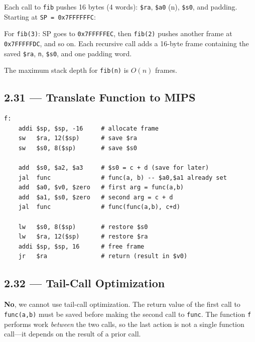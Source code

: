 Each call to \texttt{fib} pushes 16 bytes (4 words): \texttt{\$ra},
\texttt{\$a0} (n), \texttt{\$s0}, and padding. Starting at
\texttt{SP = 0x7FFFFFFC}:

For \texttt{fib(3)}: SP goes to \texttt{0x7FFFFFEC}, then \texttt{fib(2)}
pushes another frame at \texttt{0x7FFFFFDC}, and so on. Each recursive call
adds a 16-byte frame containing the saved \texttt{\$ra}, \texttt{n},
\texttt{\$s0}, and one padding word.

The maximum stack depth for \texttt{fib(n)} is $O(n)$ frames.

\subsection*{2.31 --- Translate Function to MIPS}
\hypertarget{sol-2.31}{}

\begin{verbatim}
f:
    addi $sp, $sp, -16     # allocate frame
    sw   $ra, 12($sp)      # save $ra
    sw   $s0, 8($sp)       # save $s0

    add  $s0, $a2, $a3     # $s0 = c + d (save for later)
    jal  func              # func(a, b) -- $a0,$a1 already set
    add  $a0, $v0, $zero   # first arg = func(a,b)
    add  $a1, $s0, $zero   # second arg = c + d
    jal  func              # func(func(a,b), c+d)

    lw   $s0, 8($sp)       # restore $s0
    lw   $ra, 12($sp)      # restore $ra
    addi $sp, $sp, 16      # free frame
    jr   $ra               # return (result in $v0)
\end{verbatim}

\subsection*{2.32 --- Tail-Call Optimization}
\hypertarget{sol-2.32}{}

\textbf{No}, we cannot use tail-call optimization. The return value of the
first call to \texttt{func(a,b)} must be saved before making the second call
to \texttt{func}. The function \texttt{f} performs work \emph{between} the
two calls, so the last action is not a single function call---it depends on
the result of a prior call.

